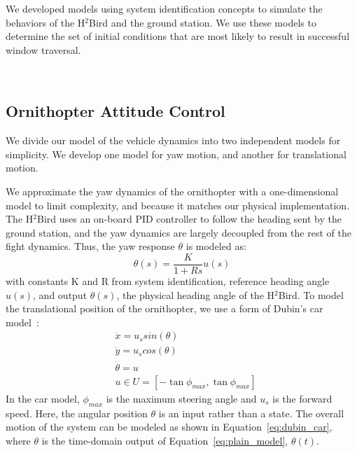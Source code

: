 \documentclass{aamas2013}
\begin{document}
We developed models using system identification concepts to simulate the
behaviors of the H$^2$Bird and the ground station. We use these models to
determine the set of initial conditions that are most likely to result in
successful window traversal.

~\subsection{Ornithopter Attitude Control}
\label{sec:model_attitude}

We divide our model of the vehicle dynamics into two independent models for 
simplicity. We develop one model for yaw motion, and another for translational motion.

We approximate the yaw dynamics of the ornithopter with a one-dimensional model to 
limit complexity, and because it matches our physical implementation. The H$^2$Bird 
uses an on-board PID controller to follow the heading sent by the ground 
station, and the yaw dynamics are largely decoupled from the rest of the fight dynamics. 
Thus, the yaw response $\theta$ is modeled as:
\begin{equation}
\label{eq:plain_model}
\theta(s) = \frac{K}{1 + Rs}u(s)
\end{equation}
with constants K and R from system identification, reference heading angle $u(s)$, and
output $\theta(s)$, the physical heading angle of the H$^2$Bird. To model the translational position of
the ornithopter, we use a form of Dubin's car model~\cite{lavalle:planning}:
\begin{equation}
\label{eq:dubin_car}
\begin{aligned}
& \dot{x} = u_{s}sin(\theta)\\
& \dot{y} = u_{s}cos(\theta)\\
& \dot{\theta} = u\\
& u \in U=[-\tan{\phi_{max}},\tan{\phi_{max}}]
\end{aligned}
\end{equation} 
In the car model, $\phi_{max}$ is the maximum steering angle and $u_{s}$ is
the forward speed. Here, the angular position $\theta$
is an input rather than a state. The overall motion of the system can be
modeled as shown in Equation~\ref{eq:dubin_car}, where $\theta$ is the
time-domain output of Equation~\ref{eq:plain_model}, $\theta(t)$.

\end{document}
